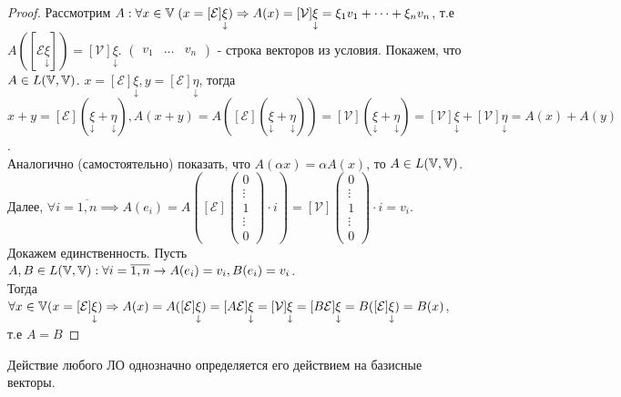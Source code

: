 \documentclass[../main.tex]{subfiles}
\begin{document}
\begin{proof}
    Рассмотрим $A: \forall x\in\mathbb{V} \;(x=[\mathcal{E}]\underset{\downarrow}{\xi})\Rightarrow A(x)= [\mathcal{V}]\underset{\downarrow}{\xi}=\xi_{1}v_{1}+\dots+\xi_{n}v_{n}$, т.е $A([\mathcal{E}\underset{\downarrow}{\xi}]) = [\mathcal{V}]\underset{\downarrow}{\xi}$. $\begin{pmatrix}
        v_{1} & \dots & v_{n}
    \end{pmatrix}$ - строка векторов из условия. Покажем, что $A\in L(\mathbb{V},\mathbb{V})$. $x= [\mathcal{E}]\underset{\downarrow}{\xi}, y= [\mathcal{E}]\underset{\downarrow}{\eta}$, тогда $x+y = [\mathcal{E}](\underset{\downarrow}{\xi}+\underset{\downarrow}{\eta}), A(x+y) = A([\mathcal{E}](\underset{\downarrow}{\xi}+\underset{\downarrow}{\eta})) = [\mathcal{V}](\underset{\downarrow}{\xi}+\underset{\downarrow}{\eta})=[\mathcal{V}]\underset{\downarrow}{\xi}+[\mathcal{V}]\underset{\downarrow}{\eta}=A(x)+A(y)$.
     \\Аналогично (самостоятельно) показать, что $A(\alpha x)=\alpha A(x)$, то $A\in L(\mathbb{V},\mathbb{V})$. Далее, $\forall i=\overline{1,n}\implies A(e_{i})=A\left([\mathcal{E}]\begin{pmatrix}
        0\\
        \vdots\\
        1\\
        \vdots\\
        0
     \end{pmatrix}\cdot i\right) = [\mathcal{V}]\begin{pmatrix}
        0\\
        \vdots\\
        1\\
        \vdots\\
        0
        \end{pmatrix}\cdot i = v_{i}$.
        \\Докажем единственность. Пусть $A,B \in L(\mathbb{V},\mathbb{V}): \forall i=\overline{1,n} \to A(e_{i})= v_{i}, B(e_{i})= v_{i}$. \\Тогда $\forall x \in \mathbb{V} (x=[\mathcal{E}]\underset{\downarrow}{\xi}) \Rightarrow A(x) = A([\mathcal{E}]\underset{\downarrow}{\xi}) = [A\mathcal{E}]\underset{\downarrow}{\xi} = [\mathcal{V}]\underset{\downarrow}{\xi} = [B \mathcal{E}]\underset{\downarrow}{\xi} = B([\mathcal{E}]\underset{\downarrow}{\xi}) = B(x)$, т.е $A=B$

\end{proof}
\begin{corollary}
    Действие любого ЛО однозначно определяется его действием на базисные векторы.
\end{corollary}
\end{document}
